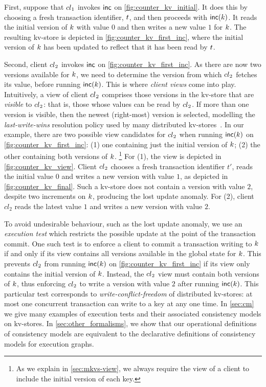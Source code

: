 First, suppose that ${cl}_1$  invokes $\mathsf{inc}$ on
\cref{fig:counter_kv_initial}. It does this by choosing a fresh
transaction identifier, $t$, 
and then proceeds with $\mathsf{inc}(k)$. It reads the initial version
of $k$ with value $0$ 
and then writes a new value $1$ for $k$. 
The resulting kv-store is depicted in \cref{fig:counter_kv_first_inc},
where  the initial version of $k$  has been  updated to reflect that it
has been read by $t$. 

Second, client ${cl}_2$ invokes $\mathsf{inc}$ on
\cref{fig:counter_kv_first_inc}.  As there are now two versions
available for $k$, we need to determine the version from which
${cl}_2$ fetches its value, before running $\mathsf{inc}(k)$.  This is
where \emph{client views} come into play.  Intuitively, a view of
client ${cl}_2$ comprises those versions in the kv-store that are
\emph{visible} to ${cl}_2$: that is, those whose values can be read by
${cl}_2$.  If more than one version is visible, then the newest
(right-most) version is selected, modelling the \emph{last-write-wins}
resolution policy used by many distributed
kv-stores~\cite{vogels:2009:ec:1435417.1435432}.  In our example,
there are two possible view candidates for ${cl}_2$ when running
$\mathsf{inc}(k)$ on \cref{fig:counter_kv_first_inc}: (1) one containing
just the initial version of $k$; (2) the other containing both
versions of $k$.%
\footnote{ As we explain in \cref{sec:mkvs-view}, we always require
  the view of a client to include the initial version of each key.}  
For (1), the view is depicted in
\cref{fig:counter_kv_view}.  Client ${cl}_2$ chooses a fresh
transaction identifier $t'$, reads the initial value $0$ and writes a
new version with value $1$, as depicted in
\cref{fig:counter_kv_final}.  Such a kv-store does not contain a
version with value $2$, despite two increments on $k$, producing
the lost update anomaly.  For (2), client $cl_2$ reads the latest
value $1$ and writes a new version with value $2$.

To avoid undesirable behaviour, such as the lost update anomaly, we
use an {\em execution test} which restricts the possible update at the
point of the transaction commit.  One such test is to enforce a client
to commit a transaction writing to $k$ if and only if its view
contains all versions available in the global state for $k$.  This
prevents ${cl}_2$ from running $\mathsf{inc}(k)$ on
\cref{fig:counter_kv_first_inc} if its view only contains the initial
version of $k$.  Instead, the ${cl}_2$ view must contain both
versions of $k$, thus enforcing ${cl}_2$ to write a version with
value $2$ after running $\mathsf{inc}(k)$. This particular test
corresponds to \emph{write-conflict-freedom} of distributed kv-stores:
at most one concurrent transaction can write to a key at any one time.
In \cref{sec:cm} we give many examples of execution tests and their
associated consistency models on kv-stores. In \cref{sec:other_formalisms}, we
show that our operational definitions of consistency models are
equivalent to the declarative definitions of consistency models for 
execution graphs. 




